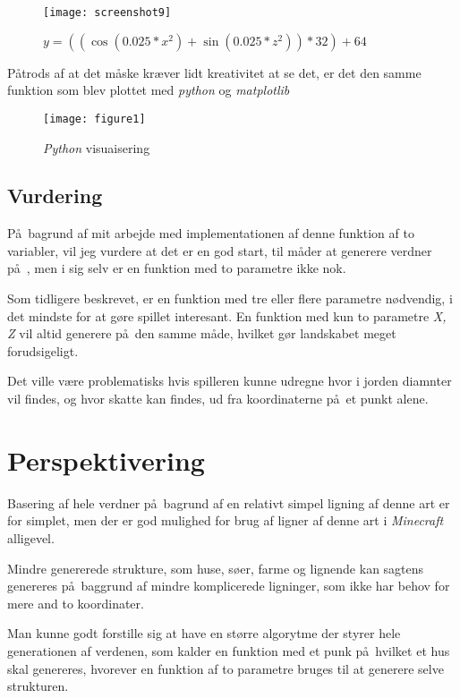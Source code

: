 \documentclass[a4paper,12pt]{report}
\begin{document}
			\begin{figure}[h]
				\texttt{[image: screenshot9]}
				\caption{\(y = ((\cos (0.025 * x^2) + \sin (0.025 * z^2)) * 32) + 64\)}
			\end{figure}

			P\aa trods af at det m\aa ske kr\ae ver lidt kreativitet at se det, er det den samme funktion som blev
			plottet med \emph{python} og \emph{matplotlib}

			\begin{figure}[h]
				\begin{center}
					\texttt{[image: figure1]}
					\caption{\emph{Python} visuaisering}
 				\end{center}
			\end{figure}

	\subsection{Vurdering}
		P\aa \ bagrund af mit arbejde med implementationen af denne funktion af to variabler, vil jeg vurdere
		at det er en god start, til m\aa der at generere verdner p\aa \ , men i sig selv er en funktion med to parametre ikke nok.

		Som tidligere beskrevet, er en funktion med tre eller flere parametre n\o dvendig, i det mindste for at g\o re spillet interesant.
		En funktion med kun to parametre \emph{X, Z} vil altid generere p\aa \ den samme m\aa de, hvilket g\o r landskabet
		meget forudsigeligt.

		Det ville v\ae re problematisks hvis spilleren kunne udregne hvor i jorden diamnter vil findes, og hvor skatte kan findes, ud fra
		koordinaterne p\aa \ et punkt alene.
	\section{Perspektivering}
		Basering af hele verdner p\aa \ bagrund af en relativt simpel ligning af denne art er for simplet, men
		der er god mulighed for brug af ligner af denne art i \emph{Minecraft} alligevel.

		Mindre genererede strukture, som huse, s\o er, farme og lignende kan sagtens genereres p\aa \ baggrund af
		mindre komplicerede ligninger, som ikke har behov for mere and to koordinater.

		Man kunne godt forstille sig at have en st\o rre algorytme der styrer hele generationen af verdenen,
		som kalder en funktion med et punk p\aa \ hvilket et hus skal genereres, hvorever en funktion af
		to parametre bruges til at generere selve strukturen.
\end{document}
